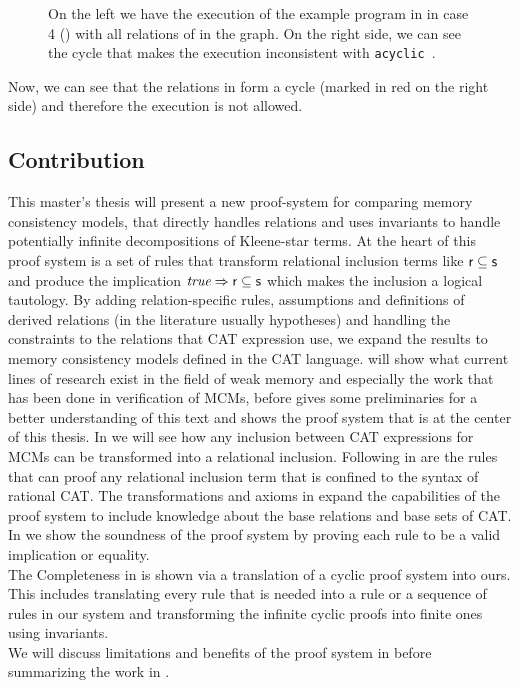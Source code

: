 \documentclass[a4paper,twoside,12pt, english]{article}
\begin{document}
\begin{figure}[h]
\begin{minipage}{0.5\textwidth}
\end{minipage}
\caption{On the left we have the execution of the example program in  in case 4 () with all relations of \hb{} in the graph. On the right side, we can see the cycle that makes the execution inconsistent with \texttt{acyclic }\hb.} \label{fig:SCexample}
\end{figure} 
\noindent Now, we can see that the relations in \hb{} form a cycle (marked in red on the right side) and therefore the execution is not allowed.

\subsection{Contribution}
This master's thesis will present a new proof-system for comparing memory consistency models, that directly handles relations and uses invariants to handle potentially infinite decompositions of Kleene-star terms.
At the heart of this proof system is a set of rules that transform relational inclusion terms like $\textsf{\upshape r} \subseteq \textsf{\upshape s}$ and produce the implication $\textit{true} \Rightarrow \textsf{\upshape r} \subseteq \textsf{\upshape s}$ which makes the inclusion a logical tautology.
By adding relation-specific rules, assumptions and definitions of derived relations (in the literature usually hypotheses) and handling the constraints to the relations that CAT expression use, we expand the results to memory consistency models defined in the CAT language.
 will show what current lines of research exist in the field of weak memory and especially the work that has been done in verification of MCMs, before  gives some preliminaries for a better understanding of this text and  shows the proof system that is at the center of this thesis. In  we will see how any inclusion between CAT expressions for MCMs can be transformed into a relational inclusion. Following in  are the rules that can proof any relational inclusion term that is confined to the syntax of rational CAT. The transformations and axioms in  expand the capabilities of the proof system to include knowledge about the base relations and base sets of CAT.  \\
In  we show the soundness of the proof system by proving each rule to be a valid implication or equality. \\
The Completeness in  is shown via a translation of a cyclic proof system \cite{Gru+26} into ours. This includes translating every rule that is needed into a rule or a sequence of rules in our system and transforming the infinite cyclic proofs into finite ones using invariants. \\
We will discuss limitations and benefits of the proof system in  before summarizing the work in .
\end{document}
